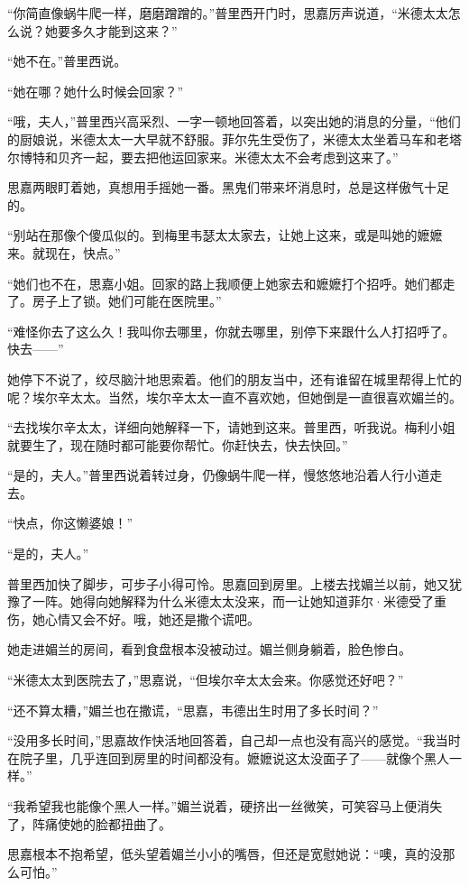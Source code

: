\par “你简直像蜗牛爬一样，磨磨蹭蹭的。”普里西开门时，思嘉厉声说道，“米德太太怎么说？她要多久才能到这来？”
\par “她不在。”普里西说。
\par “她在哪？她什么时候会回家？”
\par “哦，夫人，”普里西兴高采烈、一字一顿地回答着，以突出她的消息的分量，“他们的厨娘说，米德太太一大早就不舒服。菲尔先生受伤了，米德太太坐着马车和老塔尔博特和贝齐一起，要去把他运回家来。米德太太不会考虑到这来了。”
\par 思嘉两眼盯着她，真想用手摇她一番。黑鬼们带来坏消息时，总是这样傲气十足的。
\par “别站在那像个傻瓜似的。到梅里韦瑟太太家去，让她上这来，或是叫她的嬷嬷来。就现在，快点。”
\par “她们也不在，思嘉小姐。回家的路上我顺便上她家去和嬷嬷打个招呼。她们都走了。房子上了锁。她们可能在医院里。”
\par “难怪你去了这么久！我叫你去哪里，你就去哪里，别停下来跟什么人打招呼了。快去——”
\par 她停下不说了，绞尽脑汁地思索着。他们的朋友当中，还有谁留在城里帮得上忙的呢？埃尔辛太太。当然，埃尔辛太太一直不喜欢她，但她倒是一直很喜欢媚兰的。
\par “去找埃尔辛太太，详细向她解释一下，请她到这来。普里西，听我说。梅利小姐就要生了，现在随时都可能要你帮忙。你赶快去，快去快回。”
\par “是的，夫人。”普里西说着转过身，仍像蜗牛爬一样，慢悠悠地沿着人行小道走去。
\par “快点，你这懒婆娘！”
\par “是的，夫人。”
\par 普里西加快了脚步，可步子小得可怜。思嘉回到房里。上楼去找媚兰以前，她又犹豫了一阵。她得向她解释为什么米德太太没来，而一让她知道菲尔·米德受了重伤，她心情又会不好。哦，她还是撒个谎吧。
\par 她走进媚兰的房间，看到食盘根本没被动过。媚兰侧身躺着，脸色惨白。
\par “米德太太到医院去了，”思嘉说，“但埃尔辛太太会来。你感觉还好吧？”
\par “还不算太糟，”媚兰也在撒谎，“思嘉，韦德出生时用了多长时间？”
\par “没用多长时间，”思嘉故作快活地回答着，自己却一点也没有高兴的感觉。“我当时在院子里，几乎连回到房里的时间都没有。嬷嬷说这太没面子了——就像个黑人一样。”
\par “我希望我也能像个黑人一样。”媚兰说着，硬挤出一丝微笑，可笑容马上便消失了，阵痛使她的脸都扭曲了。
\par 思嘉根本不抱希望，低头望着媚兰小小的嘴唇，但还是宽慰她说：“噢，真的没那么可怕。”
